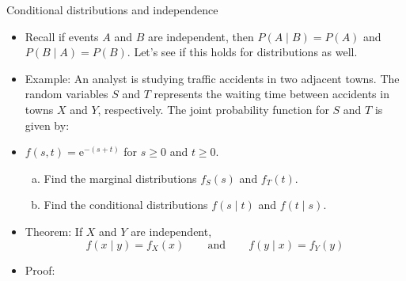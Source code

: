 \documentclass{article}
\newcommand{\e}{\mathrm{e}}		%
\begin{document}
Conditional distributions and independence\bigskip
\begin{itemize}
    \item Recall if events $A$ and $B$ are independent, then $P(A \mid B) = P(A)$ and \\$P(B \mid A) = P(B)$. Let's see if this holds for distributions as well.
    \item Example: An analyst is studying traffic accidents in two adjacent towns. The random variables $S$ and $T$ represents the waiting time between accidents in towns $X$ and $Y$, respectively. The joint probability function for $S$ and $T$ is given by:
    \item[] $f(s,t) =  \e^{-(s + t)}$ \quad for $s \ge 0$ and $t \ge 0$.
    \begin{enumerate}[(a)]
        \item Find the marginal distributions $f_S(s)$ and $f_T(t)$.\vspace{70pt}
        \item Find the conditional distributions $f(s \mid t)$ and $f(t \mid s)$.\vspace{90pt}
    \end{enumerate}
    \item Theorem: If $X$ and $Y$ are independent,
    \[f(x \mid y) = f_X(x) \hspace{25pt} \text{and} \hspace{25pt} f(y \mid x) = f_Y(y)\]
    \item Proof:\vspace{60pt}
\end{itemize}\bigskip
\end{document}
